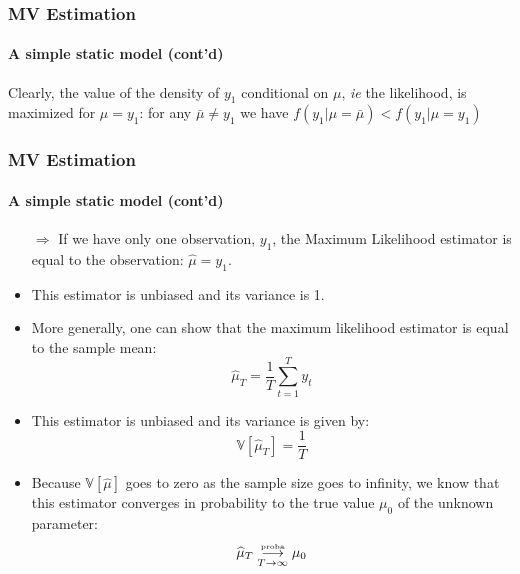 \documentclass[10pt,slidestop]{beamer}
\begin{document}
\begin{frame}
  \frametitle{MV Estimation}
  \framesubtitle{A simple static model (cont'd)}
  \begin{center}
    \begin{tikzpicture}
      
    \end{tikzpicture}
  \end{center}
  {\small Clearly, the value of the density of $y_1$ conditional on
    $\mu$, \emph{ie} the likelihood, is maximized for $\mu=y_1$: for
  any $\bar\mu\neq y_1$ we have $f(y_1|\mu=\bar\mu)<f(y_1|\mu=y_1)$}
\end{frame}


\begin{frame}
  \frametitle{MV Estimation}
  \framesubtitle{A simple static model (cont'd)}
  \begin{itemize}
  \item[$\Rightarrow$] If we have only one observation, $y_1$, the
    Maximum Likelihood estimator is equal to the observation:
    $\widehat{\mu} = y_1$.
    \bigskip
    \item This estimator is unbiased and its variance is 1.
      \bigskip
    \item More generally, one can show that the maximum likelihood
      estimator is equal to the sample mean:
      \begin{equation}
        \label{eq:simple-static-model:2}\tag{2-c}
        \widehat{\mu}_{T} = \frac{1}{T}\sum_{t=1}^Ty_t
      \end{equation}
    \item This estimator is unbiased and its variance is given by:
      \begin{equation}
        \label{eq:simple-static-model:2}\tag{2-d}
        \mathbb V\left[\widehat{\mu}_{T}\right] = \frac{1}{T}
      \end{equation}
      \item Because $\mathbb V\left[\widehat{\mu}\right]$ goes to
        zero as the sample size goes to infinity, we know that this
        estimator converges in probability to the true value $\mu_0$
        of the unknown parameter:
        \[
        \widehat{\mu}_{T}\overset{\text{\tiny{proba}}}{\underset{T\rightarrow\infty}{\longrightarrow}} \mu_0
        \]
  \end{itemize}
\end{frame}
\end{document}
